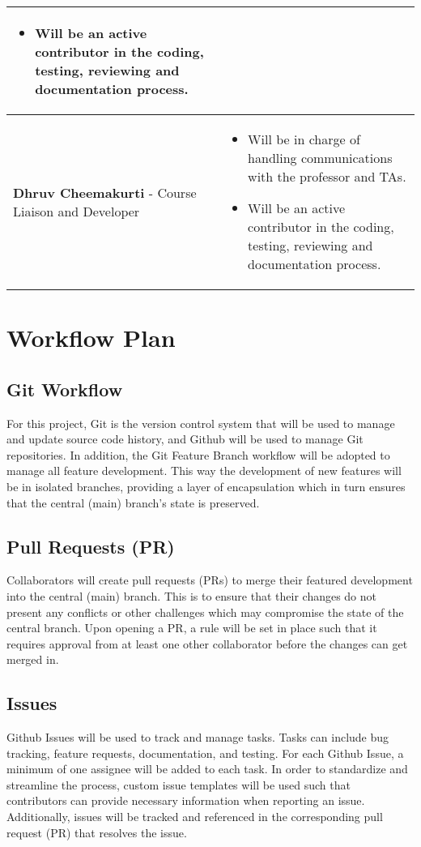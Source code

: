 \documentclass{article}
\begin{document}
\begin{tabular}{ | m{4cm} | m{8cm} | }
\begin{itemize}
        \item Will be an active contributor in the coding, testing, reviewing and documentation process.
\end{itemize}\\ 
  \hline
    \textbf{Dhruv Cheemakurti} - Course Liaison and Developer & \begin{itemize}
	\item Will be in charge of handling communications with the professor and TAs.
        \item Will be an active contributor in the coding, testing, reviewing and documentation process.
\end{itemize}\\ 
  \hline

\end{tabular}

\section{Workflow Plan}
\subsection{Git Workflow}
For this project, Git is the version control system that will be used to manage and update source code history, and Github will be used to manage Git repositories. In addition, the Git Feature Branch workflow will be adopted to manage all feature development. This way the development of new features will be in isolated branches, providing a layer of encapsulation which in turn ensures that the central (main) branch’s state is preserved.

\subsection{Pull Requests (PR)}
Collaborators will create pull requests (PRs) to merge their featured development into the central (main) branch. This is to ensure that their changes do not present any conflicts or other challenges which may compromise the state of the central branch. Upon opening a PR, a rule will be set in place such that it requires approval from at least one other collaborator before the changes can get merged in.

\subsection{Issues}
Github Issues will be used to track and manage tasks. Tasks can include bug tracking, feature requests, documentation, and testing. For each Github Issue, a minimum of one assignee will be added to each task. In order to standardize and streamline the process, custom issue templates will be used such that contributors can provide necessary information when reporting an issue. Additionally, issues will be tracked and referenced in the corresponding pull request (PR) that resolves the issue.
\end{document}

